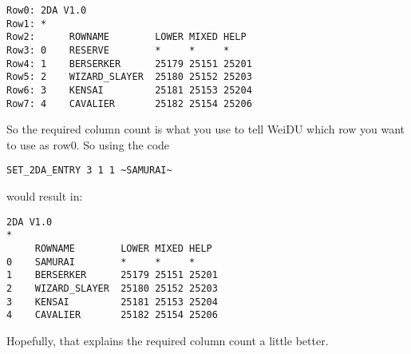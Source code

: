 \documentclass{article}
\def\ttref#1{\ahrefloc{#1}{\tt #1}}
\begin{document}
\begin{verbatim}
Row0: 2DA V1.0
Row1: *
Row2:      ROWNAME        LOWER MIXED HELP
Row3: 0    RESERVE        *     *     *
Row4: 1    BERSERKER      25179 25151 25201
Row5: 2    WIZARD_SLAYER  25180 25152 25203
Row6: 3    KENSAI         25181 25153 25204
Row7: 4    CAVALIER       25182 25154 25206
\end{verbatim}

So the required column count is what you use to tell WeiDU which row you
want to use as row0. So using the code
\begin{verbatim}
SET_2DA_ENTRY 3 1 1 ~SAMURAI~
\end{verbatim}
would result in:

\begin{verbatim}
2DA V1.0
*
     ROWNAME        LOWER MIXED HELP
0    SAMURAI        *     *     *
1    BERSERKER      25179 25151 25201
2    WIZARD_SLAYER  25180 25152 25203
3    KENSAI         25181 25153 25204
4    CAVALIER       25182 25154 25206
\end{verbatim}

Hopefully, that explains the required column count a little better.

%
%
%
%
\end{document}
